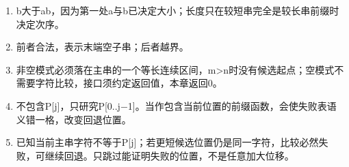 \begin{solution}[补充题核对答案]

\begin{enumerate}
\def\labelenumi{\arabic{enumi}.}
\setcounter{enumi}{3}
\tightlist
\item
  b大于ab，因为第一处a与b已决定大小；长度只在较短串完全是较长串前缀时决定次序。
\item
  前者合法，表示末端空子串；后者越界。
\item
  非空模式必须落在主串的一个等长连续区间，m\textgreater n时没有候选起点；空模式不需要字符比较，接口须约定返回值，本章返回0。
\item
  不包含P[j]，只研究P[0..j\ensuremath{-}1]。当作包含当前位置的前缀函数，会使失败表语义错一格，改变回退位置。
\item
  已知当前主串字符不等于P{[}j{]}；若更短候选位置仍是同一字符，比较必然失败，可继续回退。只跳过能证明失败的位置，不是任意加大位移。
\end{enumerate}

\end{solution}
